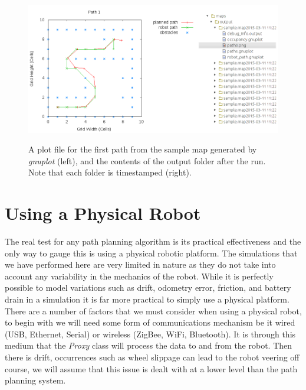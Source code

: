 \begin{figure}[htbp]

\center \includegraphics[width=400pt]{illustrations/sample_output_2}\\
\caption{A plot file for the first path from the sample map generated by \textit{gnuplot} (left), and the contents of the output folder after the run. Note that each folder is timestamped (right).} 
\label{sample_output}

\end{figure}

\newpage


\section{Using a Physical Robot}
\noindent
The real test for any path planning algorithm is its practical effectiveness \cite{FIELD} and the only way to gauge this is using a physical robotic platform. The simulations that we have performed here are very limited in nature as they do not take into account any variability in the mechanics of the robot. While it is perfectly possible to model variations such as drift, odometry error, friction, and battery drain in a simulation it is far more practical to simply use a physical platform.  \\
  
\noindent
There are a number of factors that we must consider when using a physical robot, to begin with we will need some form of communications mechanism be it wired (USB, Ethernet, Serial) or wireless (ZigBee, WiFi, Bluetooth). It is through this medium that the \textit{Proxy} class will process the data to and from the robot. Then there is drift, occurrences such as wheel slippage can lead to the robot veering off course, we will assume that this issue is dealt with at a lower level than the path planning system.

